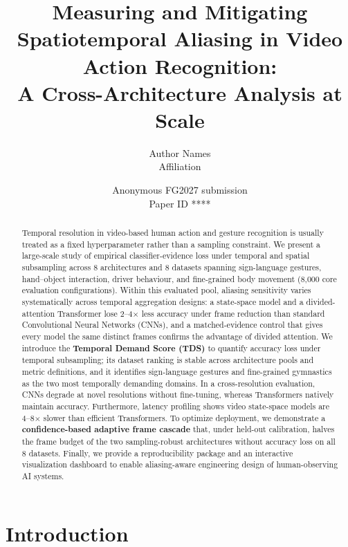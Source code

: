 \documentclass[a4paper, 10pt, conference]{ieeeconf}
\title{\LARGE \bf
Measuring and Mitigating Spatiotemporal Aliasing in Video Action Recognition:\\
A Cross-Architecture Analysis at Scale
}
\author{\parbox{16cm}{\centering
    {\large Author Names}\\
    {\normalsize Affiliation}}
}
\newcommand{\TDS}{\textsc{TDS}}
\def\FGPaperID{****} %
\begin{document}
\ifFGfinal
\thispagestyle{empty}
\pagestyle{empty}
\else
\author{Anonymous FG2027 submission\\ Paper ID \FGPaperID \\}
\pagestyle{plain}
\fi
\maketitle

\begin{abstract}
Temporal resolution in video-based human action and gesture recognition is usually treated as a fixed hyperparameter rather than a sampling constraint. We present a large-scale study of empirical classifier-evidence loss under temporal and spatial subsampling across 8 architectures and 8 datasets spanning sign-language gestures, hand--object interaction, driver behaviour, and fine-grained body movement (8,000 core evaluation configurations). Within this evaluated pool, aliasing sensitivity varies systematically across temporal aggregation designs: a state-space model and a divided-attention Transformer lose 2--4$\times$ less accuracy under frame reduction than standard Convolutional Neural Networks (CNNs), and a matched-evidence control that gives every model the same distinct frames confirms the advantage of divided attention. We introduce the \textbf{Temporal Demand Score (\TDS{})} to quantify accuracy loss under temporal subsampling; its dataset ranking is stable across architecture pools and metric definitions, and it identifies sign-language gestures and fine-grained gymnastics as the two most temporally demanding domains. In a cross-resolution evaluation, CNNs degrade at novel resolutions without fine-tuning, whereas Transformers natively maintain accuracy. Furthermore, latency profiling shows video state-space models are 4--8$\times$ slower than efficient Transformers. To optimize deployment, we demonstrate a \textbf{confidence-based adaptive frame cascade} that, under held-out calibration, halves the frame budget of the two sampling-robust architectures without accuracy loss on all 8 datasets. Finally, we provide a reproducibility package and an interactive visualization dashboard to enable aliasing-aware engineering design of human-observing AI systems.
\end{abstract}

\section{Introduction}
\label{sec:intro}
\end{document}
